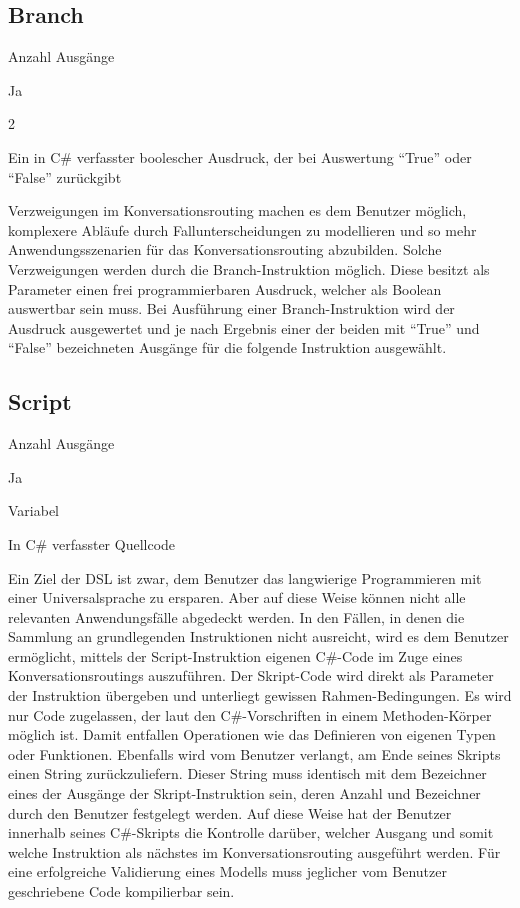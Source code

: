 \subsection{Branch}
\begin{labeling}{Anzahl Ausgänge}
\item [Eingang] Ja
\item [Anzahl Ausgänge] 2
\item [Parameter] Ein in C\# verfasster boolescher Ausdruck, der bei Auswertung ``True'' oder ``False'' zurückgibt
\item [Beschreibung] Verzweigungen im Konversationsrouting machen es dem Benutzer möglich, komplexere Abläufe durch Fallunterscheidungen zu modellieren und so mehr Anwendungsszenarien für das Konversationsrouting abzubilden. Solche Verzweigungen werden durch die  Branch-Instruktion möglich. Diese besitzt als Parameter einen frei programmierbaren Ausdruck, welcher als Boolean auswertbar sein muss. Bei Ausführung einer Branch-Instruktion wird der Ausdruck ausgewertet und je nach Ergebnis einer der beiden mit ``True'' und ``False'' bezeichneten Ausgänge für die folgende Instruktion ausgewählt.
\end{labeling}

\subsection{Script}
\label{subsec:Script}
\begin{labeling}{Anzahl Ausgänge}
\item [Eingang] Ja
\item [Anzahl Ausgänge] Variabel
\item [Parameter] In C\# verfasster Quellcode
\item [Beschreibung] Ein Ziel der DSL ist zwar, dem Benutzer das langwierige Programmieren mit einer Universalsprache zu ersparen. Aber auf diese Weise können nicht alle relevanten Anwendungsfälle abgedeckt werden. In den Fällen, in denen die Sammlung an grundlegenden Instruktionen nicht ausreicht, wird es dem Benutzer ermöglicht, mittels der Script-Instruktion eigenen C\#-Code im Zuge eines Konversationsroutings auszuführen. Der Skript-Code wird direkt als Parameter der Instruktion übergeben und unterliegt gewissen Rahmen-Bedingungen. Es wird nur Code zugelassen, der laut den C\#-Vorschriften in einem Methoden-Körper möglich ist. Damit entfallen Operationen wie das Definieren von eigenen Typen oder Funktionen. Ebenfalls wird vom Benutzer verlangt, am Ende seines Skripts einen String zurückzuliefern. Dieser String muss identisch mit dem Bezeichner eines der Ausgänge der Skript-Instruktion sein, deren Anzahl und Bezeichner durch den Benutzer festgelegt werden. Auf diese Weise hat der Benutzer innerhalb seines C\#-Skripts die Kontrolle darüber, welcher Ausgang und somit welche Instruktion als nächstes im Konversationsrouting ausgeführt werden. Für eine erfolgreiche Validierung eines Modells muss jeglicher vom Benutzer geschriebene Code kompilierbar sein.   
\end{labeling}

